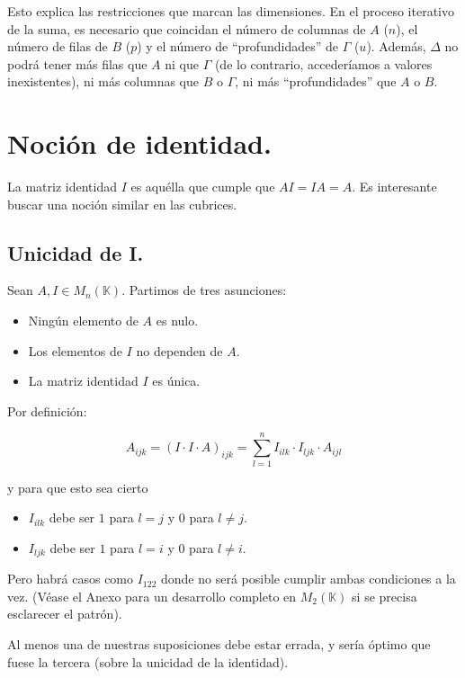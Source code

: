 \documentclass[a4paper, titlepage]{article}
\begin{document}
Esto explica las restricciones que marcan las dimensiones. En el proceso iterativo de la suma, es necesario que coincidan el número de columnas de $A$ ($n$), el número de filas de $B$ ($p$) y el número de ``profundidades'' de $\Gamma$ ($u$). Además, $\Delta$ no podrá tener más filas que $A$ ni que $\Gamma$ (de lo contrario, accederíamos a valores inexistentes), ni más columnas que $B$ o $\Gamma$, ni más ``profundidades'' que $A$ o $B$.

\section{Noción de identidad.}

La matriz identidad $I$ es aquélla que cumple que $AI = IA = A$. Es interesante buscar una noción similar en las cubrices.

\subsection{Unicidad de I.}

Sean $A, I \in M_{n} (\mathbb{K})$. Partimos de tres asunciones:

\begin{itemize}
	\item Ningún elemento de $A$ es nulo.
	\item Los elementos de $I$ no dependen de $A$.
	\item La matriz identidad $I$ es única.
\end{itemize}

Por definición:

$$A_{ijk} = (I \cdot I \cdot A)_{ijk} = \sum\limits_{l=1}^{n} I_{ilk} \cdot I_{ljk} \cdot A_{ijl}$$

y para que esto sea cierto

\begin{itemize}
	\item $I_{ilk}$ debe ser $1$ para $l = j$ y $0$ para $l \neq j$. 
	\item $I_{ljk}$ debe ser $1$ para $l = i$ y $0$ para $l \neq i$.
\end{itemize}

Pero habrá casos como $I_{122}$ donde no será posible cumplir ambas condiciones a la vez. (Véase el Anexo para un desarrollo completo en $M_2 (\mathbb{K})$ si se precisa esclarecer el patrón).

Al menos una de nuestras suposiciones debe estar errada, y sería óptimo que fuese la tercera (sobre la unicidad de la identidad).
\end{document}
